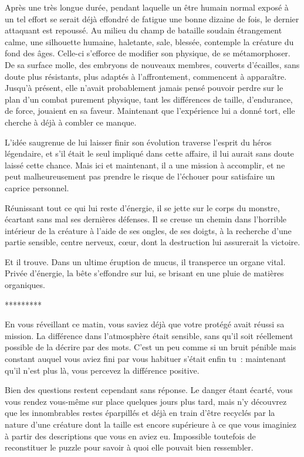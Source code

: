 \documentclass{report}
\newcommand{\ellipse}{
    \begin{center}
        *********
    \end{center}
}
\begin{document}
Après une très longue durée, pendant laquelle un être humain normal exposé à un tel effort se serait déjà effondré de fatigue une bonne dizaine de fois, le dernier attaquant est repoussé. Au milieu du champ de bataille soudain étrangement calme, une silhouette humaine, haletante, sale, blessée, contemple la créature du fond des âges. Celle-ci s'efforce de modifier son physique, de se métamorphoser. De sa surface molle, des embryons de nouveaux membres, couverts d'écailles, sans doute plus résistants, plus adaptés à l'affrontement, commencent à apparaître. Jusqu'à présent, elle n'avait probablement jamais pensé pouvoir perdre sur le plan d'un combat purement physique, tant les différences de taille, d'endurance, de force, jouaient en sa faveur. Maintenant que l'expérience lui a donné tort, elle cherche à déjà à combler ce manque.

L'idée saugrenue de lui laisser finir son évolution traverse l'esprit du héros légendaire, et s'il était le seul impliqué dans cette affaire, il lui aurait sans doute laissé cette chance. Mais ici et maintenant, il a une mission à accomplir, et ne peut malheureusement pas prendre le risque de l'échouer pour satisfaire un caprice personnel.

Réunissant tout ce qui lui reste d'énergie, il se jette sur le corps du monstre, écartant sans mal ses dernières défenses. Il se creuse un chemin dans l'horrible intérieur de la créature à l'aide de ses ongles, de ses doigts, à la recherche d'une partie sensible, centre nerveux, cœur, dont la destruction lui assurerait la victoire.

Et il trouve. Dans un ultime éruption de mucus, il transperce un organe vital. Privée d'énergie, la bête s'effondre sur lui, se brisant en une pluie de matières organiques.

\ellipse

En vous réveillant ce matin, vous saviez déjà que votre protégé avait réussi sa mission. La différence dans l'atmosphère était sensible, sans qu'il soit réellement possible de la décrire par des mots. C'est un peu comme si un bruit pénible mais constant auquel vous aviez fini par vous habituer s'était enfin tu : maintenant qu'il n'est plus là, vous percevez la différence positive.

Bien des questions restent cependant sans réponse. Le danger étant écarté, vous vous rendez vous-même sur place quelques jours plus tard, mais n'y découvrez que les innombrables restes éparpillés et déjà en train d'être recyclés par la nature d'une créature dont la taille est encore supérieure à ce que vous imaginiez à partir des descriptions que vous en aviez eu. Impossible toutefois de reconstituer le puzzle pour savoir à quoi elle pouvait bien ressembler.
\end{document}
